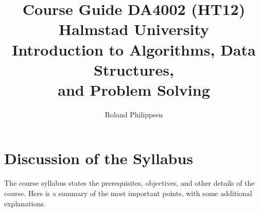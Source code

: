 \documentclass[a4paper]{article}
\begin{document}
\title{{\normalsize Course Guide DA4002 (HT12) Halmstad University}\\
  Introduction to Algorithms, Data Structures,\\ and Problem Solving}
\author{Roland Philippsen}
\maketitle



\section{Discussion of the Syllabus}

The course syllabus states the prerequisites, objectives, and other details of the course.
Here is a summary of the most important points, with some additional explanations.
\end{document}
